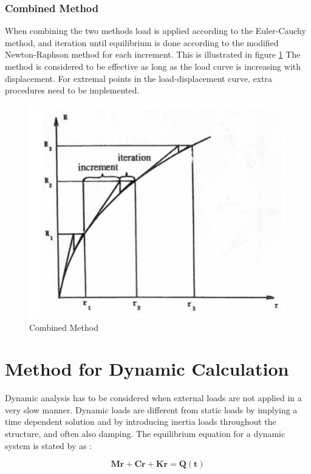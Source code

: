 \subsubsection{Combined Method}
\label{sec:combined}
When combining the two methods load is applied according to the Euler-Cauchy method, and iteration until equilibrium is done according to the modified Newton-Raphson method for each increment. This is illustrated in figure \ref{fig:combined} The method is considered to be effective as long as the load curve is increasing with displacement. For extremal points in the load-displacement curve, extra procedures need to be implemented.    

 \begin{figure}[H]
\centering
\includegraphics[scale=0.8]{figures/combined}
\caption[$\; \:$Combined Method]{Combined Method \cite{moan2003} }
 \label{fig:combined}
\end{figure}
\section{Method for Dynamic Calculation}
Dynamic analysis has to be considered when external loads are not applied in a very slow manner. Dynamic loads are different from static loads by implying a time dependent solution and by introducing inertia loads throughout the structure, and often also damping. The equilibrium equation for a dynamic system is stated by \cite{Langen1999} as :

\begin{equation}
  \boldsymbol{M \ddot{r}} + \boldsymbol{C \dot{r}} + \boldsymbol{Kr} =  \boldsymbol{Q(t)}
  \label{eq:eq}
\end{equation}

